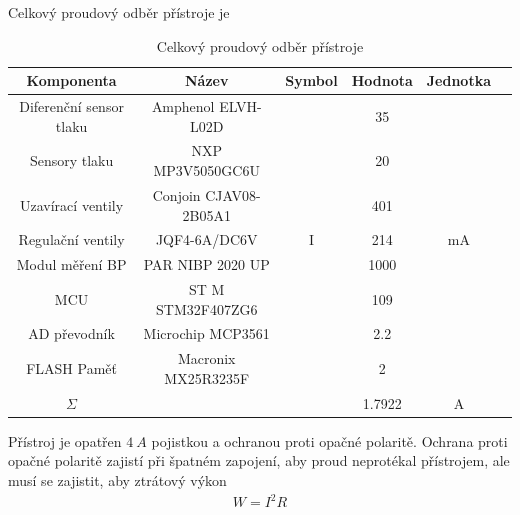 Celkový proudový odběr přístroje je
\begin{table}[H]
    \label{tab:sum_of_current}
    \caption{Celkový proudový odběr přístroje}
    \centering
    \begin{ctucolortab}
        \begin{tabular}{cccccc}
            \toprule
            Komponenta              & Název                 & Symbol & Hodnota & Jednotka \\ \midrule
            Diferenční sensor tlaku & Amphenol ELVH-L02D    &        & 35      &          \\
            Sensory tlaku           & NXP MP3V5050GC6U      &        & 20      &          \\
            Uzavírací ventily       & Conjoin CJAV08-2B05A1 &        & 401     &          \\
            Regulační ventily       & JQF4-6A/DC6V          & I      & 214     & mA       \\
            Modul měření BP         & PAR NIBP 2020 UP      &        & 1000    &          \\
            MCU                     & ST M STM32F407ZG6     &        & 109     &          \\
            AD převodník            & Microchip MCP3561     &        & 2.2     &          \\
            FLASH Paměť             & Macronix MX25R3235F   &        & 2       &          \\
            \bottomrule
            $\Sigma$                &                       &        & 1.7922  & A        \\
            \bottomrule
        \end{tabular}
    \end{ctucolortab}
\end{table}

Přístroj je opatřen $4 \ A$ pojistkou a ochranou proti opačné polaritě.
Ochrana proti opačné polaritě zajistí při špatném zapojení, aby proud neprotékal přístrojem, ale musí se zajistit, aby ztrátový výkon
\begin{align*}
    W = I^2 R
\end{align*}

